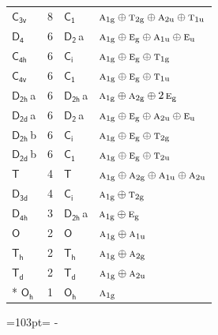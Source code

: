 \documentclass[10pt,a4paper]{article}
\newcommand{\needspace}[1]{\par\penalty-100\begingroup\dimen0=#1\relax\dimen2=\pagegoal
  \advance\dimen2-\pagetotal\ifdim\dimen0>\dimen2\relax\ifdim\dimen2>0pt\vfil\break\fi\fi
  \endgroup}
\numberwithin{equation}{section}
\newcommand{\grp}[1]{\mathsf{#1}}
\newcommand{\irr}[1]{\text{\normalfont\scshape #1}}
\newcommand{\ptag}[1]{\mathrm{#1}}
\newcommand{\clsletter}[1]{\,{\scriptsize\color{black!55}#1}}
\newlength{\fillwidth}\newlength{\cellwidth}\newlength{\colwidth}
\begin{document}
{\begin{longtable}{@{}lrl>{\RaggedRight\arraybackslash}p{\fillwidth}@{}}
\href{C3v.pdf}{$\grp{C_{3v}}$} & 8 & \href{C1.pdf}{$\grp{C_{1}}$} & $\irr{a}_{1\ptag{g}}\oplus \irr{t}_{2\ptag{g}}\oplus \irr{a}_{2\ptag{u}}\oplus \irr{t}_{1\ptag{u}}$\\
\href{D4.pdf}{$\grp{D_{4}}$} & 6 & \href{D2.pdf}{$\grp{D_{2}}$}\clsletter{a} & $\irr{a}_{1\ptag{g}}\oplus \irr{e}_{\ptag{g}}\oplus \irr{a}_{1\ptag{u}}\oplus \irr{e}_{\ptag{u}}$\\
\href{C4h.pdf}{$\grp{C_{4h}}$} & 6 & \href{S2.pdf}{$\grp{C_{i}}$} & $\irr{a}_{1\ptag{g}}\oplus \irr{e}_{\ptag{g}}\oplus \irr{t}_{1\ptag{g}}$\\
\href{C4v.pdf}{$\grp{C_{4v}}$} & 6 & \href{C1.pdf}{$\grp{C_{1}}$} & $\irr{a}_{1\ptag{g}}\oplus \irr{e}_{\ptag{g}}\oplus \irr{t}_{1\ptag{u}}$\\
\href{D2h.pdf}{$\grp{D_{2h}}$}\clsletter{a} & 6 & \href{D2h.pdf}{$\grp{D_{2h}}$}\clsletter{a} & $\irr{a}_{1\ptag{g}}\oplus \irr{a}_{2\ptag{g}}\oplus 2\,\irr{e}_{\ptag{g}}$\\
\href{D2d.pdf}{$\grp{D_{2d}}$}\clsletter{a} & 6 & \href{D2.pdf}{$\grp{D_{2}}$}\clsletter{a} & $\irr{a}_{1\ptag{g}}\oplus \irr{e}_{\ptag{g}}\oplus \irr{a}_{2\ptag{u}}\oplus \irr{e}_{\ptag{u}}$\\
\href{D2h.pdf}{$\grp{D_{2h}}$}\clsletter{b} & 6 & \href{S2.pdf}{$\grp{C_{i}}$} & $\irr{a}_{1\ptag{g}}\oplus \irr{e}_{\ptag{g}}\oplus \irr{t}_{2\ptag{g}}$\\
\href{D2d.pdf}{$\grp{D_{2d}}$}\clsletter{b} & 6 & \href{C1.pdf}{$\grp{C_{1}}$} & $\irr{a}_{1\ptag{g}}\oplus \irr{e}_{\ptag{g}}\oplus \irr{t}_{2\ptag{u}}$\\
\href{T.pdf}{$\grp{T}$} & 4 & \href{T.pdf}{$\grp{T}$} & $\irr{a}_{1\ptag{g}}\oplus \irr{a}_{2\ptag{g}}\oplus \irr{a}_{1\ptag{u}}\oplus \irr{a}_{2\ptag{u}}$\\
\href{D3d.pdf}{$\grp{D_{3d}}$} & 4 & \href{S2.pdf}{$\grp{C_{i}}$} & $\irr{a}_{1\ptag{g}}\oplus \irr{t}_{2\ptag{g}}$\\
\href{D4h.pdf}{$\grp{D_{4h}}$} & 3 & \href{D2h.pdf}{$\grp{D_{2h}}$}\clsletter{a} & $\irr{a}_{1\ptag{g}}\oplus \irr{e}_{\ptag{g}}$\\
\href{O.pdf}{$\grp{O}$} & 2 & \href{O.pdf}{$\grp{O}$} & $\irr{a}_{1\ptag{g}}\oplus \irr{a}_{1\ptag{u}}$\\
\href{Th.pdf}{$\grp{T_{h}}$} & 2 & \href{Th.pdf}{$\grp{T_{h}}$} & $\irr{a}_{1\ptag{g}}\oplus \irr{a}_{2\ptag{g}}$\\
\href{Td.pdf}{$\grp{T_{d}}$} & 2 & \href{Td.pdf}{$\grp{T_{d}}$} & $\irr{a}_{1\ptag{g}}\oplus \irr{a}_{2\ptag{u}}$\\*
\href{Oh.pdf}{$\grp{O_{h}}$} & 1 & \href{Oh.pdf}{$\grp{O_{h}}$} & $\irr{a}_{1\ptag{g}}$\\
\bottomrule\end{longtable}}
\needspace{103pt}
\end{document}
